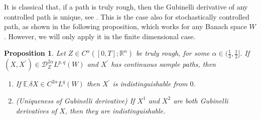 \documentclass[11pt,a4paper]{article}
\newcommand{\R}{\mathbb{R}}
\theoremstyle{plain}
\newtheorem{prop}[defn]{Proposition}
\begin{document}
It is classical that, if a path is truly rough, then the Gubinelli derivative of any controlled path is unique, see \cite[Proposition 6.4]{FH20}. This is the case also for stochastically controlled path, as shown in the following proposition, which works for any Banach space $W$. However, we will only apply it in the finite dimensional case.

\begin{prop}
    \label{prop: uniqueness truly rough}
    Let $Z \in C^\alpha([0,T];\R^n)$
    be truly rough, for some $\alpha \in (\frac{1}{3},\frac{1}{2}]$. If \linebreak $(X,X^{\prime}) \in \mathscr{D}_{Z}^{2\alpha}L^{p,q}(W)$ and $X^{\prime}$ has continuous sample paths, then
    \begin{enumerate}
        \item If $\mathbb{E}_{\cdot}\delta X \in C^{2\alpha}L^q(W)$ then $X^{\prime}$ is indistinguishable from $0$.
        \item \textit{(Uniqueness of Gubinelli derivative)} If $X^1$ and $X^2$ are both Gubinelli derivatives of $X$, then they are indistinguishable.
    \end{enumerate}
\end{prop}
\end{document}
